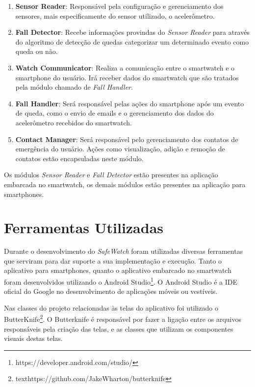\begin{enumerate}
	\item{\textbf{Sensor Reader}: Responsável pela configuração e gerenciamento dos sensores, mais especificamente do sensor utilizado, o acelerômetro. }
	
	\item{\textbf{Fall Detector}: Recebe informações provindas do \textit{Sensor Reader} para através do algoritmo de detecção de quedas categorizar um determinado evento como queda ou não.}
	
	\item{\textbf{Watch Communicator}: Realiza a comunicação entre o smartwatch e o smartphone do usuário. Irá receber dados do smartwatch que são tratados pela módulo chamado de \textit{Fall Handler}.}
	
	\item{\textbf{Fall Handler}: Será responsável pelas ações do smartphone após um evento de queda, como o envio de emails e o gerenciamento dos dados do acelerômetro recebidos do smartwatch.}
	
	\item{\textbf{Contact Manager}: Será responsável pelo gerenciamento dos contatos de emergência do usuário. Ações como visualização, adição e remoção de contatos estão encapsuladas neste módulo.}
			
\end{enumerate}

Os módulos \textit{Sensor Reader} e \textit{Fall Detector} estão presentes na aplicação embarcada no smartwatch, os demais módulos estão presentes na aplicação para smartphones. 

\section{Ferramentas Utilizadas}
\label{sec:tools}
Durante o desenvolvimento do \textit{SafeWatch} foram utilizadas diversas ferramentas que serviram para dar suporte a sua implementação e execução. Tanto o aplicativo para smartphones, quanto o aplicativo embarcado no smartwatch foram desenvolvidos utilizando o Android Studio\footnote{https://developer.android.com/studio/}. O Android Studio é a \ac{IDE} oficial do Google no desenvolvimento de aplicações móveis ou vestíveis.


Nas classes do projeto relacionadas às telas do aplicativo foi utilizado o ButterKnife\footnote{texthttps://github.com/JakeWharton/butterknife}. O Butterknife é responsável por fazer a ligação entre os arquivos responsáveis pela criação das telas, e as classes que utilizam os componentes visuais destas telas. 

